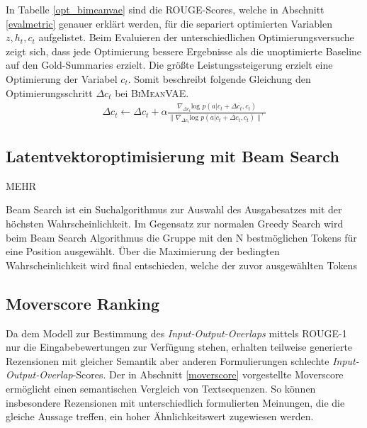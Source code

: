 In Tabelle \ref{opt_bimeanvae} sind die ROUGE-Scores, welche in Abschnitt \ref*{evalmetric} genauer erklärt werden, für die separiert optimierten Variablen $z, h_t, c_t$ aufgelistet.
Beim Evaluieren der unterschiedlichen Optimierungsversuche zeigt sich, dass jede Optimierung bessere Ergebnisse als die unoptimierte Baseline auf den Gold-Summaries erzielt.
Die größte Leistungssteigerung erzielt eine Optimierung der Variabel $c_t$.
Somit beschreibt folgende Gleichung den Optimierungsschritt $\Delta c_t$ bei \textsc{BiMeanVAE}.
\begin{align*}
    \Delta c_t \leftarrow \Delta c_t + \alpha \frac{\nabla_{\Delta c_t} \text{log }p(a|c_t+\Delta c_t,c_t)}{\| \nabla_{\Delta c_t} \text{log }p(a|c_t +\Delta c_t ,c_t )\|^\gamma}
\end{align*}




\subsection{Latentvektoroptimisierung mit Beam Search}
MEHR

Beam Search ist ein Suchalgorithmus zur Auswahl des Ausgabesatzes mit der höchsten Wahrscheinlichkeit. 
Im Gegensatz zur normalen Greedy Search wird beim Beam Search Algorithmus die Gruppe mit den N bestmöglichen Tokens für eine Position ausgewählt. 
Über die Maximierung der bedingten Wahrscheinlichkeit wird final entschieden, welche der zuvor ausgewählten Tokens 

\subsection{Moverscore Ranking}
\label{moverscore_ranking}
Da dem Modell zur Bestimmung des \textit{Input-Output-Overlaps} mittels ROUGE-1 nur die Eingabebewertungen zur Verfügung stehen, erhalten teilweise generierte Rezensionen mit gleicher Semantik aber anderen Formulierungen schlechte  \textit{Input-Output-Overlap}-Scores.
Der in Abschnitt \ref{moverscore} vorgestellte Moverscore ermöglicht einen semantischen Vergleich von Textsequenzen. 
So können insbesondere Rezensionen mit unterschiedlich formulierten Meinungen, die die gleiche Aussage treffen, ein hoher Ähnlichkeitswert zugewiesen werden.


